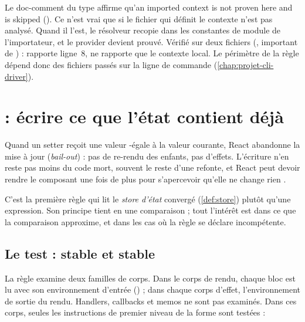 \begin{piege}
Le doc-comment du type affirme qu'\og an imported context is not proven here and is skipped\fg{} (). Ce n'est vrai que si le fichier qui définit le contexte n'est pas analysé. Quand il l'est, le résolveur recopie  dans les constantes de module de l'importateur, et le provider devient prouvé. Vérifié sur deux fichiers (,  important  de ) :  rapporte  ligne~8,  ne rapporte que le contexte local. Le périmètre de la règle dépend donc des fichiers passés sur la ligne de commande (\cref{chap:projet-cli-driver}).
\end{piege}

\section{ : écrire ce que l'état contient déjà}
\label{sec:regles-etat-redundant}

\begin{react}
Quand un setter reçoit une valeur -égale à la valeur courante, React abandonne la mise à jour (\emph{bail-out}) : pas de re-rendu des enfants, pas d'effets. L'écriture n'en reste pas moins du code mort, souvent le reste d'une refonte, et React peut devoir rendre le composant une fois de plus pour s'apercevoir qu'elle ne change rien \cite{ReactDocs}.
\end{react}

C'est la première règle qui lit le \emph{store d'état} convergé (\cref{def:store}) plutôt qu'une expression. Son principe tient en une comparaison ; tout l'intérêt est dans ce que la comparaison approxime, et dans les cas où la règle se déclare incompétente.

\subsection{Le test : stable et stable}

La règle examine deux familles de corps. Dans le corps de rendu, chaque bloc est lu avec son environnement d'entrée () ; dans chaque corps d'effet, l'environnement de sortie du rendu. Handlers, callbacks et memos ne sont pas examinés. Dans ces corps, seules les instructions de premier niveau de la forme  sont testées :

